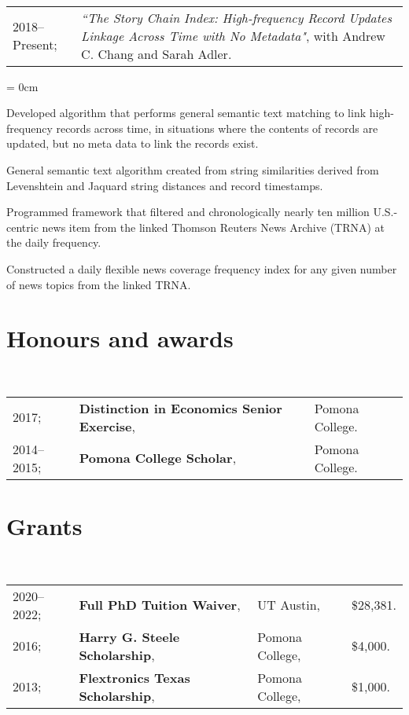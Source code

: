 \documentclass[a4paper, 11pt]{article}
\begin{document}
  ~\begin{tabular}{l p{13cm}}
    2018--Present; & \textit{``The Story Chain Index: High-frequency Record Updates Linkage Across Time with No Metadata"}, with Andrew C. Chang and Sarah Adler.
  \end{tabular}
  \begin{compactitem}\parskip = 0cm
    \item Developed algorithm that performs general semantic text matching to link high-frequency records across time, in situations where the contents of records are updated, but no meta data to link the records exist.
    \item General semantic text algorithm created from string similarities derived from Levenshtein and Jaquard string distances and record timestamps.
    \item Programmed framework that filtered and chronologically nearly ten million U.S.-centric news item from the linked Thomson Reuters News Archive (TRNA) at the daily frequency.
    \item Constructed a daily flexible news coverage frequency index for any given number of news topics from the linked TRNA.
  \end{compactitem}
      
  \section{Honours and awards}
  ~\begin{tabular}{lll}
    2017; & \textbf{Distinction in Economics Senior Exercise}, & Pomona College.\\
    2014--2015; & \textbf{Pomona College Scholar}, & Pomona College.
  \end{tabular}
      
  \section{Grants}
  ~\begin{tabular}{llll}
    2020--2022; & \textbf{Full PhD Tuition Waiver}, & UT Austin, & \$28,381. \\
    2016; & \textbf{Harry G. Steele Scholarship}, & Pomona College, & \$4,000.\\
    2013; & \textbf{Flextronics Texas Scholarship}, & Pomona College, & \$1,000.
  \end{tabular}
      
  \iffalse
\end{document}
